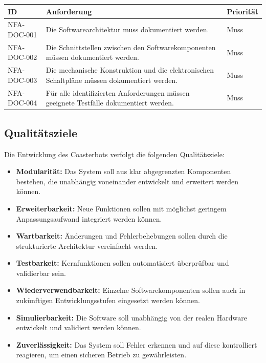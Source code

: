 \documentclass[
  a4paper,
  12pt,
  DIV=12,        %
  parskip=half,  %
  headings=small %
]{scrartcl}
\theoremstyle{definition}
\providecommand{\tightlist}{%
  \setlength{\itemsep}{0pt}\setlength{\parskip}{0pt}}
\theoremstyle{definition}
\begin{document}
\begin{longtable}[]{@{}
  >{\raggedright\arraybackslash}p{}
  >{\raggedright\arraybackslash}p{}
  >{\raggedright\arraybackslash}p{}@{}}
\toprule\noalign{}
\begin{minipage}[b]{\linewidth}\raggedright
ID
\end{minipage} & \begin{minipage}[b]{\linewidth}\raggedright
Anforderung
\end{minipage} & \begin{minipage}[b]{\linewidth}\raggedright
Priorität
\end{minipage} \\
\midrule\noalign{}
\endhead
\bottomrule\noalign{}
\endlastfoot
NFA-DOC-001 & Die Softwarearchitektur muss dokumentiert werden. &
Muss \\
NFA-DOC-002 & Die Schnittstellen zwischen den Softwarekomponenten müssen
dokumentiert werden. & Muss \\
NFA-DOC-003 & Die mechanische Konstruktion und die elektronischen
Schaltpläne müssen dokumentiert werden. & Muss \\
NFA-DOC-004 & Für alle identifizierten Anforderungen müssen geeignete
Testfälle dokumentiert werden. & Muss \\
\end{longtable}

\subsection{Qualitätsziele}\label{qualituxe4tsziele}

Die Entwicklung des Coasterbots verfolgt die folgenden Qualitätsziele:

\begin{itemize}
\tightlist
\item
  \textbf{Modularität:} Das System soll aus klar abgegrenzten
  Komponenten bestehen, die unabhängig voneinander entwickelt und
  erweitert werden können.
\item
  \textbf{Erweiterbarkeit:} Neue Funktionen sollen mit möglichst
  geringem Anpassungsaufwand integriert werden können.
\item
  \textbf{Wartbarkeit:} Änderungen und Fehlerbehebungen sollen durch die
  strukturierte Architektur vereinfacht werden.
\item
  \textbf{Testbarkeit:} Kernfunktionen sollen automatisiert überprüfbar
  und validierbar sein.
\item
  \textbf{Wiederverwendbarkeit:} Einzelne Softwarekomponenten sollen
  auch in zukünftigen Entwicklungsstufen eingesetzt werden können.
\item
  \textbf{Simulierbarkeit:} Die Software soll unabhängig von der realen
  Hardware entwickelt und validiert werden können.
\item
  \textbf{Zuverlässigkeit:} Das System soll Fehler erkennen und auf
  diese kontrolliert reagieren, um einen sicheren Betrieb zu
  gewährleisten.
\end{itemize}
\end{document}
